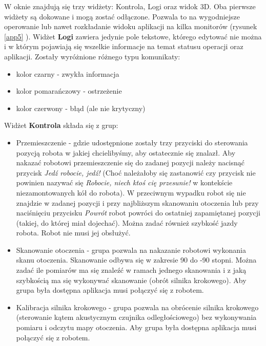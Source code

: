 \documentclass[a4paper,12pt]{article}
\begin{document}
W oknie znajdują się trzy widżety: Kontrola, Logi oraz widok 3D. Oba pierwsze widżety są dokowane i mogą zostać odłączone. Pozwala to na wygodniejsze operowanie lub nawet rozkładanie widoku aplikacji na kilka monitorów (rysunek \ref{app5} ). Widżet \textbf{Logi} zawiera jedynie pole tekstowe, którego edytować nie można i w którym pojawiają się wszelkie informacje na temat statusu operacji oraz aplikacji. Zostały wyróżnione różnego typu komunikaty:
\begin{itemize}
\item kolor czarny - zwykła informacja
\item kolor pomarańczowy - ostrzeżenie
\item kolor czerwony - błąd (ale nie krytyczny)
\end{itemize}
Widżet \textbf{Kontrola} składa się z grup:
\begin{itemize}
\item Przemieszczenie - gdzie udostępnione zostały trzy przyciski do sterowania pozycją robota w jakiej chcielibyśmy, aby ostatecznie się znalazł. Aby nakazać robotowi przemieszczenie się do zadanej pozycji należy nacisnąć przycisk \textit{Jedź robocie, jedź!} (Choć należałoby się zastanowić czy przycisk nie powinien nazywać się \textit{Robocie, niech ktoś cię przesunie!} w kontekście niezamontowanych kół do robota). W przeciwnym wypadku robot się nie znajdzie w zadanej pozycji i przy najbliższym skanowaniu otoczenia lub przy naciśnięciu przycisku \textit{Powrót} robot powróci do ostatniej zapamiętanej pozycji (takiej, do której miał dojechać). Można zadać również szybkość jazdy robota. Robot nie musi jej obsłużyć.
\item Skanowanie otoczenia - grupa pozwala na nakazanie robotowi wykonania skanu otoczenia. Skanowanie odbywa się w zakresie 90 do -90 stopni. Można zadać ile pomiarów ma się znaleźć w ramach jednego skanowania i z jaką szybkością ma się wykonywać skanowanie (obrót silnika krokowego). Aby grupa była dostępna aplikacja musi połączyć się z robotem. 
\item Kalibracja silnika krokowego - grupa pozwala na obrócenie silnika krokowego (sterowanie kątem akustycznym czujnika odległościowego) bez wykonywania pomiaru i odczytu mapy otoczenia. Aby grupa była dostępna aplikacja musi połączyć się z robotem.
\end{itemize}
\end{document}

